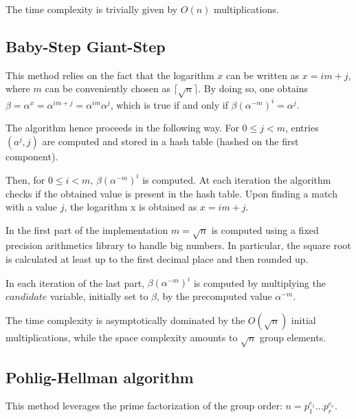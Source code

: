 \documentclass[UTF8]{article}
\begin{document}
\begin{minipage}{\linewidth}

\end{minipage}

The time complexity is trivially given by $O(n)$ multiplications.

\subsection{Baby-Step Giant-Step}

This method relies on the fact that the logarithm $x$ can be written as $x = i m + j$, where $m$ can be conveniently chosen as $\lceil \sqrt{n} \rceil$. By doing so, one obtains $\beta = \alpha^{x} = \alpha^{i m + j} = \alpha^{i m} \alpha^{j}$, which is true if and only if $\beta (\alpha^{-m})^i = \alpha^{j}$.

The algorithm hence proceeds in the following way. For $0 \leq j < m$, entries $(a^j, j)$ are computed and stored in a hash table (hashed on the first component).

Then, for $0 \leq i < m$, $\beta (\alpha^{-m})^i$ is computed. At each iteration the algorithm checks if the obtained value is present in the hash table. Upon finding a match with a value $j$, the logarithm x is obtained as $x = i m + j$.

\begin{minipage}{\linewidth}

\end{minipage}

In the first part of the implementation $m = \sqrt{n}$ is computed using a fixed precision arithmetics library to handle big numbers. In particular, the square root is calculated at least up to the first decimal place and then rounded up.

In each iteration of the last part, $\beta (\alpha^{-m})^i$ is computed by multiplying the $candidate$ variable, initially set to $\beta$, by the precomputed value $\alpha^{-m}$.

The time complexity is asymptotically dominated by the $O(\sqrt{n})$ initial multiplications, while the space complexity amounts to $\sqrt{n}$ group elements.

\subsection{Pohlig-Hellman algorithm}

This method leverages the prime factorization of the group order: $n = p_1^{e_1} \ldots p_r^{e_r}$.
\end{document}
